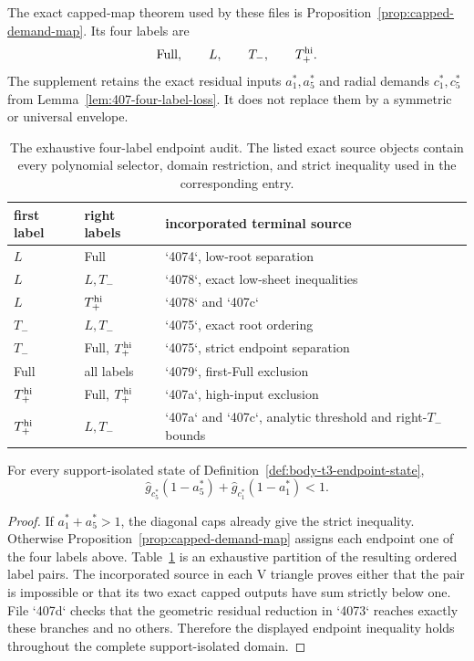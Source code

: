 The exact capped-map theorem used by these files is
Proposition~\ref{prop:capped-demand-map}.  Its four labels are
\[
 \mathrm{Full},\qquad L,\qquad T_-,\qquad T_+^{\rm hi}.
\]
The supplement retains the exact residual inputs $a_1^*,a_5^*$ and radial
demands $c_1^*,c_5^*$ from Lemma~\ref{lem:407-four-label-loss}.  It does not
replace them by a symmetric or universal envelope.

\begin{table}[H]
\centering
\scriptsize
\renewcommand{\arraystretch}{1.08}
\begin{tabular}{p{}p{}p{}}
\toprule
first label&right labels&incorporated terminal source\\
\midrule
$L$&Full&`4074`, low-root separation\\
$L$&$L,T_-$&`4078`, exact low-sheet inequalities\\
$L$&$T_+^{\rm hi}$&`4078` and `407c`\\
$T_-$&$L,T_-$&`4075`, exact root ordering\\
$T_-$&Full, $T_+^{\rm hi}$&`4075`, strict endpoint separation\\
Full&all labels&`4079`, first-Full exclusion\\
$T_+^{\rm hi}$&Full, $T_+^{\rm hi}$&`407a`, high-input exclusion\\
$T_+^{\rm hi}$&$L,T_-$&`407a` and `407c`, analytic threshold and right-$T_-$ bounds\\
\bottomrule
\end{tabular}
\caption{The exhaustive four-label endpoint audit.  The listed exact source
objects contain every polynomial selector, domain restriction, and strict
inequality used in the corresponding entry.}
\label{tab:paper-407-complete-audit}
\end{table}

\begin{theorem}
\label{thm:paper-complete-t3-endpoint}
For every support-isolated state of
Definition~\ref{def:body-t3-endpoint-state},
\[
 \widehat g_{c_5^*}(1-a_5^*)+
 \widehat g_{c_1^*}(1-a_1^*)<1.
\]
\end{theorem}

\begin{proof}
If $a_1^*+a_5^*>1$, the diagonal caps already give the strict inequality.
Otherwise Proposition~\ref{prop:capped-demand-map} assigns each endpoint one
of the four labels above.  Table~\ref{tab:paper-407-complete-audit} is an
exhaustive partition of the resulting ordered label pairs.  The incorporated
source in each V triangle proves either that the pair is impossible or that its two
exact capped outputs have sum strictly below one.  File `407d` checks that the
geometric residual reduction in `4073` reaches exactly these branches and no
others.  Therefore the displayed endpoint inequality holds throughout the
complete support-isolated domain.
\end{proof}


